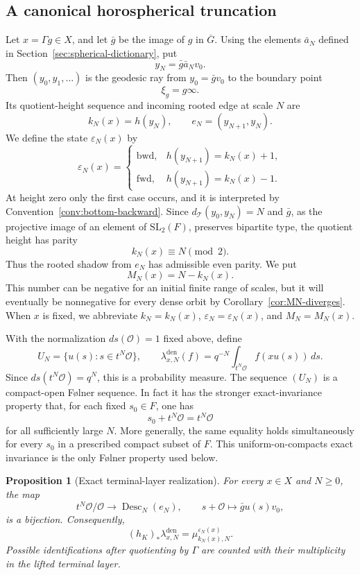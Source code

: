 \documentclass[11pt]{amsart}
\theoremstyle{definition}
\theoremstyle{plain}
\newtheorem{proposition}[definition]{Proposition}
\newcommand{\cO}{\mathcal O}
\newcommand{\bG}{\overline G}
\newcommand{\Tree}{\mathcal T}
\newcommand{\fwd}{\mathrm{fwd}}
\newcommand{\bwd}{\mathrm{bwd}}
\newcommand{\Desc}{\operatorname{Desc}}
\begin{document}
\subsection{A canonical horospherical truncation}
Let \(x=\Gamma g\in X\), and let \(\bar g\) be the image of \(g\) in
\(\bG\).  Using the elements \(\bar a_N\) defined in
Section~\ref{sec:spherical-dictionary}, put
\[
y_N=\bar g\bar a_Nv_0.
\]
Then \((y_0,y_1,\ldots)\) is the geodesic ray from
\(y_0=\bar g v_0\) to the boundary point
\[
\xi_g=g\infty.
\]
Its quotient-height sequence and incoming rooted edge at scale \(N\) are
\[
k_N(x)=h(y_N),
\qquad
e_N=(y_{N+1},y_N).
\]
We define the state \(\varepsilon_N(x)\) by
\[
\varepsilon_N(x)=
\begin{cases}
\bwd,&h(y_{N+1})=k_N(x)+1,\\
\fwd,&h(y_{N+1})=k_N(x)-1.
\end{cases}
\]
At height zero only the first case occurs, and it is interpreted by
Convention~\ref{conv:bottom-backward}.  Since
\(d_\Tree(y_0,y_N)=N\) and \(\bar g\), as the projective image of an element
of \(\mathrm{SL}_2(F)\), preserves bipartite type, the quotient height has
parity
\[
k_N(x)\equiv N\pmod2.
\]
Thus the rooted shadow from \(e_N\) has admissible even parity.  We put
\[
M_N(x)=N-k_N(x).
\]
This number can be negative for an initial finite range of scales, but it will
eventually be nonnegative for every dense orbit by
Corollary~\ref{cor:MN-diverges}.
When \(x\) is fixed, we abbreviate
\(k_N=k_N(x)\), \(\varepsilon_N=\varepsilon_N(x)\), and
\(M_N=M_N(x)\).

With the normalization \(ds(\cO)=1\) fixed above, define
\[
U_N=\{u(s):s\in t^N\cO\},
\qquad
\lambda_{x,N}^{\mathrm{den}}(f)
 =q^{-N}\int_{t^N\cO}f(xu(s))\,ds.
\]
Since \(ds(t^N\cO)=q^N\), this is a probability measure.  The sequence
\((U_N)\) is a compact-open F{\o}lner sequence.  In fact it has the stronger
exact-invariance property that, for
each fixed \(s_0\in F\), one has
\[
s_0+t^N\cO=t^N\cO
\]
for all sufficiently large \(N\).  More generally, the same equality holds
simultaneously for every \(s_0\) in a prescribed compact subset of \(F\).
This uniform-on-compacts exact invariance is the only F{\o}lner property used
below.

\begin{proposition}[Exact terminal-layer realization]
\label{prop:dense-exact-shadow}
For every \(x\in X\) and \(N\ge0\), the map
\[
t^N\cO/\cO\longrightarrow \Desc_N(e_N),
\qquad
s+\cO\longmapsto \bar g u(s)v_0,
\]
is a bijection.  Consequently,
\begin{equation}\label{eq:dense-exact-shadow}
(h_K)_*\lambda_{x,N}^{\mathrm{den}}
 =\mu^{\varepsilon_N(x)}_{k_N(x),N}.
\end{equation}
Possible identifications after quotienting by \(\Gamma\) are counted with their
multiplicity in the lifted terminal layer.
\end{proposition}
\end{document}
